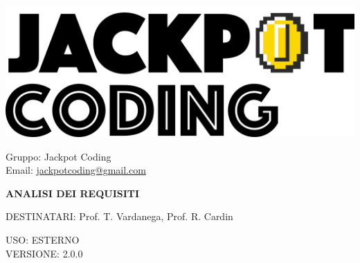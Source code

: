 \documentclass[5pt]{article}
\begin{document}
\begin{minipage}[t]{0.50\textwidth}
    \begin{flushleft}
        \hspace{10pt}
        \includegraphics[scale=0.65]{jackpot-logo.png} 
    \end{flushleft}
\end{minipage}
\hspace{-60pt} %
\begin{flushright}
    \begin{minipage}[t]{0.50\textwidth}
        \begin{flushright}
            Gruppo: {\Large Jackpot Coding}\\
            Email: \href{mailto:jackpotcoding@gmail.com}{jackpotcoding@gmail.com}
        \end{flushright}
    \end{minipage}
\end{flushright}

\vspace{24pt}

\begin{center}
    \textbf{\LARGE ANALISI DEI REQUISITI}
\end{center}

\vspace{13pt}

\begin{flushleft}
    \begin{spacing}{1.5}
        DESTINATARI: Prof. T. Vardanega, Prof. R. Cardin\\
    \end{spacing}
\end{flushleft}

\begin{flushright}
    \begin{spacing}{1}
        USO: ESTERNO\\
        VERSIONE: 2.0.0\\
    \end{spacing}
\end{flushright}
\end{document}
